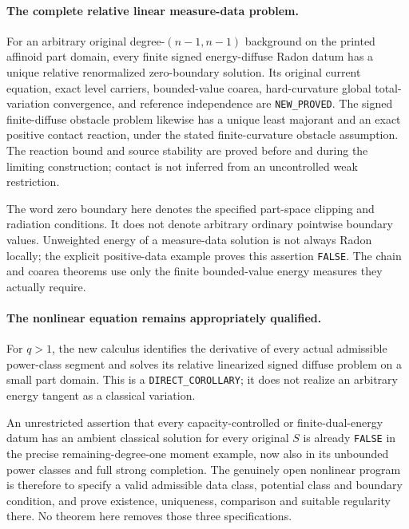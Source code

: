 \paragraph{The complete relative linear measure-data problem.}
For an arbitrary original degree-$(n-1,n-1)$
background on the printed affinoid part domain,
every finite signed energy-diffuse Radon datum
has a unique relative renormalized zero-boundary
solution.  Its original current equation,
exact level carriers, bounded-value coarea,
hard-curvature global total-variation convergence,
and reference independence are
\texttt{NEW\_PROVED}.
The signed finite-diffuse obstacle problem
likewise has a unique least majorant and
an exact positive contact reaction, under
the stated finite-curvature obstacle
assumption.
The reaction bound and source stability
are proved before and during the limiting
construction; contact is not inferred
from an uncontrolled weak restriction.

The word zero boundary here denotes the
specified part-space clipping and radiation
conditions.  It does not denote arbitrary
ordinary pointwise boundary values.
Unweighted energy of a measure-data
solution is not always Radon locally;
the explicit positive-data example
proves this assertion \texttt{FALSE}.
The chain and coarea theorems use only
the finite bounded-value energy measures
they actually require.

\paragraph{The nonlinear equation remains appropriately qualified.}
For $q>1$, the new calculus identifies the
derivative of every actual admissible
power-class segment and solves its
relative linearized signed diffuse
problem on a small part domain.
This is a \texttt{DIRECT\_COROLLARY};
it does not realize an arbitrary energy
tangent as a classical variation.

An unrestricted assertion that every
capacity-controlled or finite-dual-energy
datum has an ambient classical solution
for every original $S$ is already
\texttt{FALSE} in the precise remaining-degree-one
moment example, now also in its unbounded
power classes and full strong completion.
The genuinely open nonlinear program is
therefore to specify a valid admissible
data class, potential class and boundary
condition, and prove existence, uniqueness,
comparison and suitable regularity there.
No theorem here removes those three
specifications.

